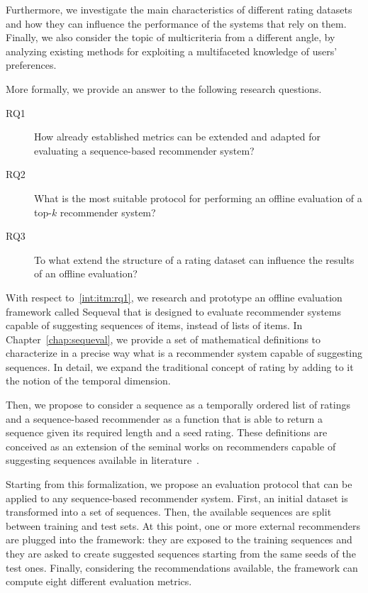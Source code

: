Furthermore, we investigate the main characteristics of different rating datasets and how they can influence the performance of the systems that rely on them. Finally, we also consider the topic of multicriteria from a different angle, by analyzing existing methods for exploiting a multifaceted knowledge of users' preferences.

More formally, we provide an answer to the following research questions.

\begin{description}
\item[RQ1\label{int:itm:rq1}] How already established metrics can be extended and adapted for evaluating a sequence-based recommender system?
\item[RQ2\label{int:itm:rq2}] What is the most suitable protocol for performing an offline evaluation of a top-$k$ recommender system?
\item[RQ3\label{int:itm:rq3}] To what extend the structure of a rating dataset can influence the results of an offline evaluation?
\end{description}

With respect to~\ref{int:itm:rq1}, we research and prototype an offline evaluation framework called Sequeval that is designed to evaluate recommender systems capable of suggesting sequences of items, instead of lists of items. In Chapter~\ref{chap:sequeval}, we provide a set of mathematical definitions to characterize in a precise way what is a recommender system capable of suggesting sequences. In detail, we expand the traditional concept of rating by adding to it the notion of the temporal dimension.

Then, we propose to consider a sequence as a temporally ordered list of ratings and a sequence-based recommender as a function that is able to return a sequence given its required length and a seed rating. These definitions are conceived as an extension of the seminal works on recommenders capable of suggesting sequences available in literature~\cite{Quadrana2018}.

Starting from this formalization, we propose an evaluation protocol that can be applied to any sequence-based recommender system. First, an initial dataset is transformed into a set of sequences. Then, the available sequences are split between training and test sets. At this point, one or more external recommenders are plugged into the framework: they are exposed to the training sequences and they are asked to create suggested sequences starting from the same seeds of the test ones. Finally, considering the recommendations available, the framework can compute eight different evaluation metrics.


